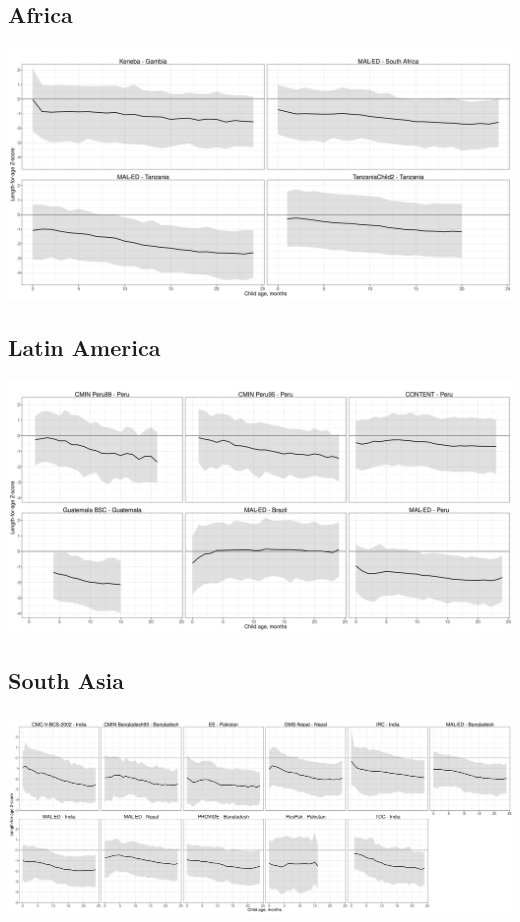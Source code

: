 \documentclass[
  9pt,
]{book}
\begin{document}
\hypertarget{africa}{%
\subsection{Africa}\label{africa}}

\includegraphics[width=66.67in]{figures//stunting/fig-laz-2-quant-cohort-africa-allage-primary}

\hypertarget{latin-america}{%
\subsection{Latin America}\label{latin-america}}

\includegraphics[width=66.67in]{figures//stunting/fig-laz-2-quant-cohort-latamer-allage-primary}

\hypertarget{south-asia}{%
\subsection{South Asia}\label{south-asia}}

\includegraphics[width=83.33in]{figures//stunting/fig-laz-2-quant-cohort-asia-allage-primary}
\end{document}
